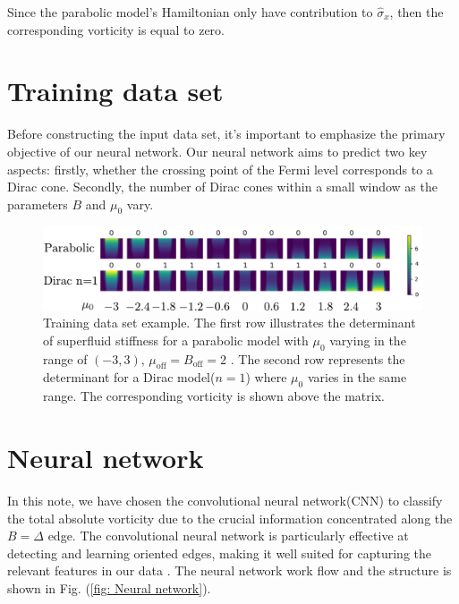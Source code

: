 \documentclass{article}
\begin{document}
Since the parabolic model's Hamiltonian only have contribution to $ \hat{\sigma}_x $, then the corresponding vorticity is equal to zero. 

\section{Training data set}
Before constructing the input data set, it's important to emphasize the primary objective of our neural network. Our neural network aims to predict two key aspects: firstly, whether the crossing point of the Fermi level corresponds to a Dirac cone. Secondly, the number of Dirac cones within a small window as the parameters $ B $ and $ \mu_0 $ vary.



\begin{figure}[H]
    \centering
    \includegraphics[width=1\textwidth]{Training Data.pdf}
    \caption{Training data set example. The first row illustrates the determinant of superfluid stiffness for a parabolic model with $ \mu_0 $ varying in the range of $ \left(-3,3\right) $, $  \mu_{\textrm{off}} = B_{\textrm{off}} = 2$  . The second row represents the determinant for a Dirac model($ n=1 $) where $ \mu_0 $ varies in the same range. The corresponding vorticity is shown above the matrix.}
    \label{fig: Training Data}
\end{figure}
\section{Neural network}
In this note, we have chosen the convolutional neural network(CNN)\cite{lecun1998gradient,krizhevsky2012imagenet,goodfellow2016deep} to classify the total absolute vorticity due to the crucial information concentrated along the $ B=\Delta $ edge. The convolutional neural network is particularly effective at detecting and learning oriented edges, making it well suited for capturing the relevant features in our data . The neural network work flow and the structure is shown in Fig. (\ref{fig: Neural network}). 
\end{document}
